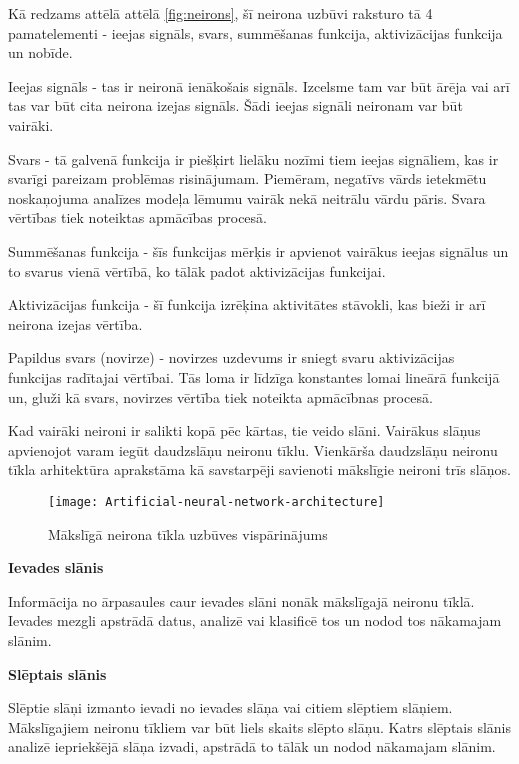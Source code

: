 Kā redzams attēlā attēlā \ref{fig:neirons}, šī neirona uzbūvi raksturo tā 4 pamatelementi - ieejas signāls, svars, summēšanas funkcija, aktivizācijas funkcija un nobīde.

Ieejas signāls - tas ir neironā ienākošais signāls. Izcelsme tam var būt ārēja vai arī tas var būt cita neirona izejas signāls. Šādi ieejas signāli neironam var būt vairāki.

Svars - tā galvenā funkcija ir piešķirt lielāku nozīmi tiem ieejas signāliem, kas ir svarīgi pareizam problēmas risinājumam. Piemēram, negatīvs vārds ietekmētu noskaņojuma analīzes modeļa lēmumu vairāk nekā neitrālu vārdu pāris. Svara vērtības tiek noteiktas apmācības procesā.

Summēšanas funkcija - šīs funkcijas mērķis ir apvienot vairākus ieejas signālus un to svarus vienā vērtībā, ko tālāk padot aktivizācijas funkcijai.

Aktivizācijas funkcija - šī funkcija izrēķina aktivitātes stāvokli, kas bieži ir arī neirona izejas vērtība.	

Papildus svars (novirze) -  novirzes uzdevums ir sniegt svaru aktivizācijas funkcijas radītajai vērtībai. Tās loma ir līdzīga konstantes lomai lineārā funkcijā un, gluži kā svars, novirzes vērtība tiek noteikta apmācībnas procesā.

Kad vairāki neironi ir salikti kopā pēc kārtas, tie veido slāni. Vairākus slāņus apvienojot varam iegūt daudzslāņu neironu tīklu. Vienkārša daudzslāņu neironu tīkla arhitektūra aprakstāma kā savstarpēji savienoti mākslīgie neironi trīs slāņos.

\begin{figure}[H]
	\texttt{[image: Artificial-neural-network-architecture]}
	\caption{Mākslīgā neirona tīkla uzbūves vispārinājums \cite{artificialNeuralNetBre} }
	\label{fig:Artificial-neural-network-architecture}
\end{figure}

\textbf{Ievades slānis}

Informācija no ārpasaules caur ievades slāni nonāk mākslīgajā neironu tīklā. Ievades mezgli apstrādā datus, analizē vai klasificē tos un nodod tos nākamajam slānim.

\textbf{Slēptais slānis}

Slēptie slāņi izmanto ievadi no ievades slāņa vai citiem slēptiem slāņiem. Mākslīgajiem neironu tīkliem var būt liels skaits slēpto slāņu. Katrs slēptais slānis analizē iepriekšējā slāņa izvadi, apstrādā to tālāk un nodod nākamajam slānim.

